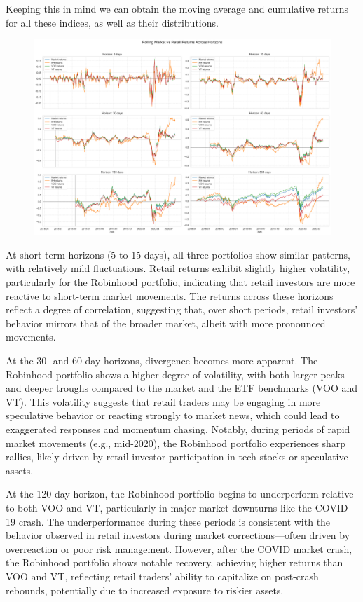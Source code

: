Keeping this in mind we can obtain the moving average and cumulative returns for all these indices, as well as their distributions.

\begin{figure}[h!]
    \centering
    \includegraphics[width=1\linewidth]
    {../images/returns_comparison.png}
    \label{fig:enter-label}
\end{figure}

At short-term horizons (5 to 15 days), all three portfolios show similar patterns, with relatively mild fluctuations. Retail returns exhibit slightly higher volatility, particularly for the Robinhood portfolio, indicating that retail investors are more reactive to short-term market movements. The returns across these horizons reflect a degree of correlation, suggesting that, over short periods, retail investors' behavior mirrors that of the broader market, albeit with more pronounced movements.

At the 30- and 60-day horizons, divergence becomes more apparent. The Robinhood portfolio shows a higher degree of volatility, with both larger peaks and deeper troughs compared to the market and the ETF benchmarks (VOO and VT). This volatility suggests that retail traders may be engaging in more speculative behavior or reacting strongly to market news, which could lead to exaggerated responses and momentum chasing. Notably, during periods of rapid market movements (e.g., mid-2020), the Robinhood portfolio experiences sharp rallies, likely driven by retail investor participation in tech stocks or speculative assets.

At the 120-day horizon, the Robinhood portfolio begins to underperform relative to both VOO and VT, particularly in major market downturns like the COVID-19 crash. The underperformance during these periods is consistent with the behavior observed in retail investors during market corrections—often driven by overreaction or poor risk management. However, after the COVID market crash, the Robinhood portfolio shows notable recovery, achieving higher returns than VOO and VT, reflecting retail traders' ability to capitalize on post-crash rebounds, potentially due to increased exposure to riskier assets.

